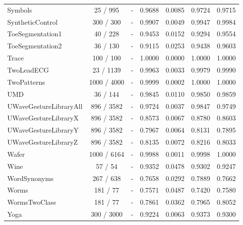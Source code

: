 \begin{longtable}{lcccccc}
Symbols & 25 / 995 & - & 0.9688 & 0.0085 & 0.9724 & 0.9715 \\
SyntheticControl & 300 / 300 & - & 0.9907 & 0.0049 & 0.9947 & 0.9984 \\
ToeSegmentation1 & 40 / 228 & - & 0.9453 & 0.0152 & 0.9294 & 0.9554 \\
ToeSegmentation2 & 36 / 130 & - & 0.9115 & 0.0253 & 0.9438 & 0.9603 \\
Trace & 100 / 100 & - & 1.0000 & 0.0000 & 1.0000 & 1.0000 \\
TwoLeadECG & 23 / 1139 & - & 0.9963 & 0.0033 & 0.9979 & 0.9990 \\
TwoPatterns & 1000 / 4000 & - & 0.9999 & 0.0002 & 1.0000 & 1.0000 \\
UMD & 36 / 144 & - & 0.9845 & 0.0110 & 0.9850 & 0.9859 \\
UWaveGestureLibraryAll & 896 / 3582 & - & 0.9724 & 0.0037 & 0.9847 & 0.9749 \\
UWaveGestureLibraryX & 896 / 3582 & - & 0.8573 & 0.0067 & 0.8780 & 0.8603 \\
UWaveGestureLibraryY & 896 / 3582 & - & 0.7967 & 0.0064 & 0.8131 & 0.7895 \\
UWaveGestureLibraryZ & 896 / 3582 & - & 0.8135 & 0.0072 & 0.8216 & 0.8033 \\
Wafer & 1000 / 6164 & - & 0.9988 & 0.0011 & 0.9998 & 1.0000 \\
Wine & 57 / 54 & - & 0.9352 & 0.0478 & 0.9302 & 0.9247 \\
WordSynonyms & 267 / 638 & - & 0.7658 & 0.0292 & 0.7889 & 0.7662 \\
Worms & 181 / 77 & - & 0.7571 & 0.0487 & 0.7420 & 0.7580 \\
WormsTwoClass & 181 / 77 & - & 0.7861 & 0.0362 & 0.7965 & 0.8052 \\
Yoga & 300 / 3000 & - & 0.9224 & 0.0063 & 0.9373 & 0.9300 \\
\bottomrule
\end{longtable}
